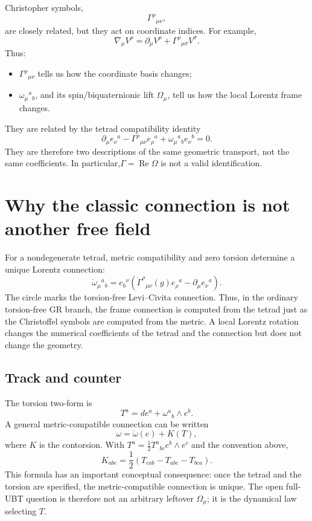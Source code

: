 Christopher symbols,
\[
 \Gamma^\rho{}_{\mu\nu},
\]
are closely related, but they act on coordinate indices.  For example,
\[
 \nabla_\mu V^\rho=\partial_\mu V^\rho
 +\Gamma^\rho{}_{\mu\sigma}V^\sigma.
\]
Thus:
\begin{itemize}
 \item $\Gamma^\rho{}_{\mu\nu}$ tells us how the coordinate basis changes;
 \item $\omega_\mu{}^a{}_b$, and its spin/biquaternionic lift $\Omega_\mu$,
       tell us how the local Lorentz frame changes.
\end{itemize}
They are related by the tetrad compatibility identity
\[
 \partial_\mu e_\nu{}^a-\Gamma^\rho{}_{\mu\nu}e_\rho{}^a
 +\omega_\mu{}^a{}_b e_\nu{}^b=0.
\]
They are therefore two descriptions of the same geometric transport, not the
same coefficients.  In particular,$\Gamma=\operatorname{Re}\Omega$ is not a
valid identification.

\section{Why the classic connection is not another free field}
For a nondegenerate tetrad, metric compatibility and zero torsion determine a
unique Lorentz connection:
\[
 \boxed{
 \mathring\omega_\mu{}^a{}_b
 =e_b{}^\nu\left(\mathring\Gamma^\rho{}_{\mu\nu}(g)e_\rho{}^a
 -\partial_\mu e_\nu{}^a\right).}
\]
The circle marks the torsion-free Levi--Civita connection.  Thus, in the
ordinary torsion-free GR branch, the frame connection is computed from the
tetrad just as the Christoffel symbols are computed from the metric.  A local
Lorentz rotation changes the numerical coefficients of the tetrad and the
connection but does not change the geometry.

\subsection{Track and counter}
The torsion two-form is
\[
 T^a=de^a+\omega^a{}_b\wedge e^b.
\]
A general metric-compatible connection can be written
\[
 \boxed{\omega=\mathring\omega(e)+K(T),}
\]
where $K$ is the contorsion.  With
$T^a=\tfrac12T^a{}_{bc}e^b\wedge e^c$ and the convention above,
\[
 \boxed{
 K_{abc}=\frac12\left(T_{cab}-T_{abc}-T_{bca}\right).}
\]
This formula has an important conceptual consequence: once the tetrad and the
torsion are specified, the metric-compatible connection is unique.  The open
full-UBT question is therefore not an arbitrary leftover $\Omega_\mu$; it is
the dynamical law selecting $T$.

